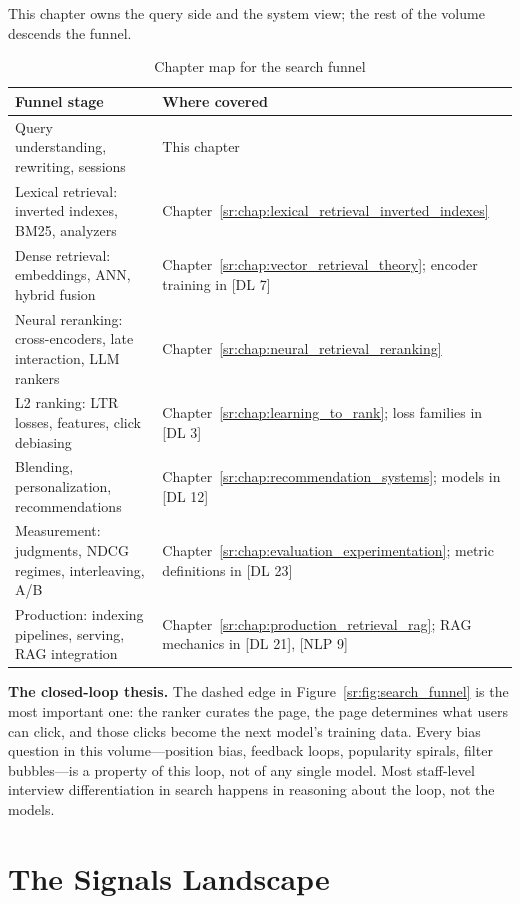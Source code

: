 This chapter owns the query side and the system view; the rest of the volume descends the funnel.

\begin{table}[H]
\centering
\small
\caption{Chapter map for the search funnel}
\label{sr:tab:chapter_map}
\begin{tabularx}{\textwidth}{lX}
\toprule
\textbf{Funnel stage} & \textbf{Where covered} \\
\midrule
Query understanding, rewriting, sessions & This chapter \\
Lexical retrieval: inverted indexes, BM25, analyzers & Chapter~\ref{sr:chap:lexical_retrieval_inverted_indexes} \\
Dense retrieval: embeddings, ANN, hybrid fusion & Chapter~\ref{sr:chap:vector_retrieval_theory}; encoder training in [DL 7] \\
Neural reranking: cross-encoders, late interaction, LLM rankers & Chapter~\ref{sr:chap:neural_retrieval_reranking} \\
L2 ranking: LTR losses, features, click debiasing & Chapter~\ref{sr:chap:learning_to_rank}; loss families in [DL 3] \\
Blending, personalization, recommendations & Chapter~\ref{sr:chap:recommendation_systems}; models in [DL 12] \\
Measurement: judgments, NDCG regimes, interleaving, A/B & Chapter~\ref{sr:chap:evaluation_experimentation}; metric definitions in [DL 23] \\
Production: indexing pipelines, serving, RAG integration & Chapter~\ref{sr:chap:production_retrieval_rag}; RAG mechanics in [DL 21], [NLP 9] \\
\bottomrule
\end{tabularx}
\end{table}

\textbf{The closed-loop thesis.} The dashed edge in Figure~\ref{sr:fig:search_funnel} is the most important one: the ranker curates the page, the page determines what users can click, and those clicks become the next model's training data. Every bias question in this volume---position bias, feedback loops, popularity spirals, filter bubbles---is a property of this loop, not of any single model. Most staff-level interview differentiation in search happens in reasoning about the loop, not the models.

\section{The Signals Landscape}
\label{sr:sec:signals_landscape}

